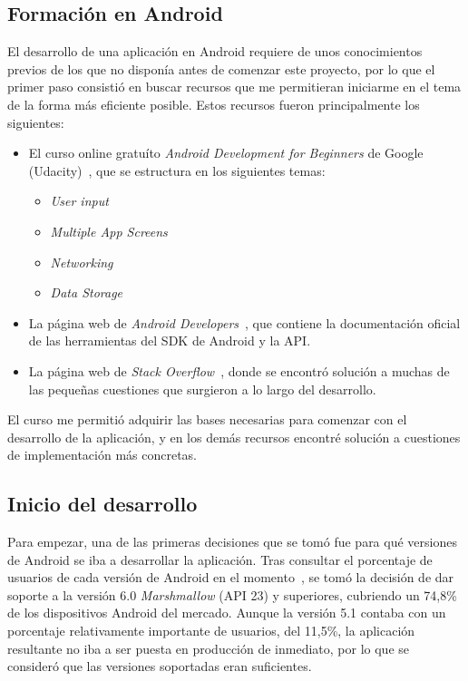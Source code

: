 \subsection{Formación en Android}

El desarrollo de una aplicación en Android requiere de unos conocimientos previos de los que no disponía antes de comenzar este proyecto, por lo que el primer paso consistió en buscar recursos que me permitieran iniciarme en el tema de la forma más eficiente posible. Estos recursos fueron principalmente los siguientes: 

\begin{itemize}
	\item El curso online gratuíto \textit{Android Development for Beginners} de Google (Udacity)~\cite{udacity}, que se estructura en los siguientes temas: 
	
	\begin{minipage}{\linewidth}
	\begin{itemize}
		\item \textit{User input}
		\item \textit{Multiple App Screens}
		\item \textit{Networking}
		\item \textit{Data Storage} 
	\end{itemize}
	\end{minipage}
	\item La página web de \textit{Android Developers}~\cite{androiddevelopers}, que contiene la documentación oficial de las herramientas del SDK de Android y la API. 
	\item La página web de \textit{Stack Overflow}~\cite{stackoverflow}, donde se encontró solución a muchas de las pequeñas cuestiones que surgieron a lo largo del desarrollo. 
\end{itemize}

El curso me permitió adquirir las bases necesarias para comenzar con el desarrollo de la aplicación, y en los demás recursos encontré solución a cuestiones de implementación más concretas. 

\subsection{Inicio del desarrollo}

Para empezar, una de las primeras decisiones que se tomó fue para qué versiones de Android se iba a desarrollar la aplicación. Tras consultar el porcentaje de usuarios de cada versión de Android en el momento~\cite{paneldecontrol}, se tomó la decisión de dar soporte a la versión 6.0 \textit{Marshmallow} (API 23) y superiores, cubriendo un 74,8\% de los dispositivos Android del mercado. Aunque la versión 5.1 contaba con un porcentaje relativamente importante de usuarios, del 11,5\%, la aplicación resultante no iba a ser puesta en producción de inmediato, por lo que se consideró que las versiones soportadas eran suficientes. 

